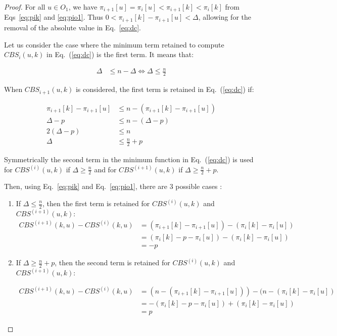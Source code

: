 \documentclass{scrartcl}
\theoremstyle{plain}
\newcommand{\cbs}{CBS}
\begin{document}
\begin{proof}
For all $u \in O_1$, we have $\pi_{i+1}[u] = \pi_{i}[u] < \pi_{i+1}[k] < 
\pi_{i}[k] $ from Eqs~\ref{eq:pik} and \ref{eq:pio1}. Thus $0 < \pi_{i+1}[k] - 
\pi_{i+1}[u] < \Delta$, allowing for the removal of the absolute value in 
Eq.~\ref{eq:dc}.

Let us consider the case where the minimum term retained to compute 
$\cbs{}_i(u,k)$ in Eq.~(\ref{eq:dc}) is the first term. It means that:

\begin{align}
 \Delta &\leq n - \Delta \Leftrightarrow  \Delta \leq \frac{n}{2}
\end{align}

When $\cbs{}_{i+1}(u,k)$ is considered, the first term is retained in 
Eq.~(\ref{eq:dc}) if:

\begin{align}
 \pi_{i+1}[k] - \pi_{i+1}[u] &\leq n - (\pi_{i+1}[k] - \pi_{i+1}[u]) \\ 
\nonumber
 \Delta - p  &\leq n - (\Delta - p) \\ \nonumber
 2(\Delta - p) &\leq n \\ \nonumber
 \Delta &\leq \frac{n}{2} + p
\end{align}

Symmetrically the second term in the minimum function in Eq.~(\ref{eq:dc}) is 
used for $\cbs{}^{(i)}(u,k)$ if $\Delta \geq \frac{n}{2}$ and for 
$\cbs{}^{(i+1)}(u,k)$ if $\Delta \geq \frac{n}{2} + p$. 

Then, using Eq.~\ref{eq:pik} and Eq.~\ref{eq:pio1}, there are 3 possible cases :

\begin{enumerate}
\item  If $\Delta \leq \frac{n}{2}$, then the first term is retained for 
$\cbs{}^{(i)}(u,k)$ and $\cbs{}^{(i+1)}(u,k)$:
  \begin{align}
\cbs{}^{(i+1)}(k,u) - \cbs{}^{(i)}(k,u) &= (\pi_{i+1}[k] - \pi_{i+1}[u]) -    
(\pi_i[k] - \pi_{i}[u]) \\ \nonumber
&= (\pi_i[k] - p - \pi_i[u]) - (\pi_{i}[k] - \pi_{i}[u]) \\ \nonumber
&= - p
  \end{align}
  
\item If $\Delta \geq \frac{n}{2} + p$, then the second term is retained for 
$\cbs{}^{(i)}(u,k)$ and $\cbs{}^{(i+1)}(u,k)$:

\begin{align}
\cbs{}^{(i+1)}(k,u) - \cbs{}^{(i)}(k,u) &= (n - (\pi_{i+1}[k] - \pi_{i+1}[u]))
- (n - (\pi_i[k] - \pi_{i}[u]) \\ \nonumber
&= -(\pi_i[k] - p - \pi_i[u]) + (\pi_{i}[k] - \pi_{i}[u]) \\ \nonumber
&= p
\end{align}


\end{enumerate}
\end{proof}
\end{document}
